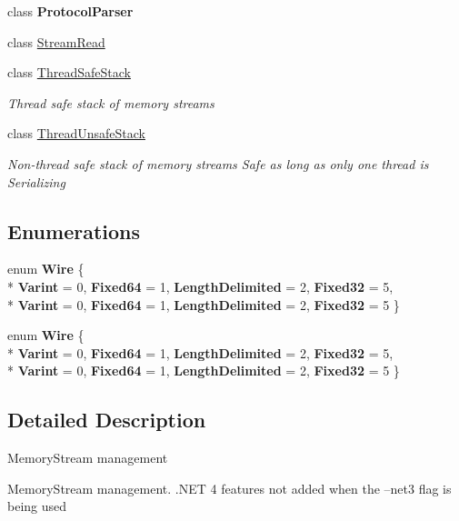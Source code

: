 \begin{DoxyCompactItemize}
class {\bfseries Protocol\+Parser}
\item 
class \hyperlink{class_silent_orbit_1_1_protocol_buffers_1_1_stream_read}{Stream\+Read}
\item 
class \hyperlink{class_silent_orbit_1_1_protocol_buffers_1_1_thread_safe_stack}{Thread\+Safe\+Stack}
\begin{DoxyCompactList}\small\item\em Thread safe stack of memory streams \end{DoxyCompactList}\item 
class \hyperlink{class_silent_orbit_1_1_protocol_buffers_1_1_thread_unsafe_stack}{Thread\+Unsafe\+Stack}
\begin{DoxyCompactList}\small\item\em Non-\/thread safe stack of memory streams Safe as long as only one thread is Serializing \end{DoxyCompactList}\end{DoxyCompactItemize}
\subsection*{Enumerations}
\begin{DoxyCompactItemize}
\item 
enum {\bfseries Wire} \{ \\*
{\bfseries Varint} = 0, 
{\bfseries Fixed64} = 1, 
{\bfseries Length\+Delimited} = 2, 
{\bfseries Fixed32} = 5, 
\\*
{\bfseries Varint} = 0, 
{\bfseries Fixed64} = 1, 
{\bfseries Length\+Delimited} = 2, 
{\bfseries Fixed32} = 5
 \}\hypertarget{namespace_silent_orbit_1_1_protocol_buffers_a028c6c6bce285110df2b8d94c97b6862}{}\label{namespace_silent_orbit_1_1_protocol_buffers_a028c6c6bce285110df2b8d94c97b6862}

\item 
enum {\bfseries Wire} \{ \\*
{\bfseries Varint} = 0, 
{\bfseries Fixed64} = 1, 
{\bfseries Length\+Delimited} = 2, 
{\bfseries Fixed32} = 5, 
\\*
{\bfseries Varint} = 0, 
{\bfseries Fixed64} = 1, 
{\bfseries Length\+Delimited} = 2, 
{\bfseries Fixed32} = 5
 \}\hypertarget{namespace_silent_orbit_1_1_protocol_buffers_a028c6c6bce285110df2b8d94c97b6862}{}\label{namespace_silent_orbit_1_1_protocol_buffers_a028c6c6bce285110df2b8d94c97b6862}

\end{DoxyCompactItemize}


\subsection{Detailed Description}
Memory\+Stream management 

Memory\+Stream management. .N\+ET 4 features not added when the --net3 flag is being used 